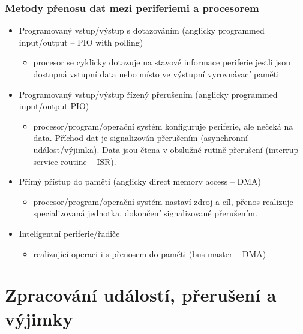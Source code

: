 \documentclass{beamer}
\begin{document}
\begin{frame}
\frametitle{Metody přenosu dat mezi periferiemi a procesorem}

\begin{itemize}
 \item Programovaný vstup/výstup s dotazováním (anglicky programmed input/output -- PIO with polling)
 \begin{itemize}
  \item procesor se cyklicky dotazuje na stavové informace periferie
        jestli jsou dostupná vstupní data nebo místo ve výstupní vyrovnávací paměti
 \end{itemize}
\end{itemize}
\begin{itemize}
 \item Programovaný vstup/výstup řízený přerušením (anglicky programmed input/output PIO)
 \begin{itemize}
  \item procesor/program/operační systém konfiguruje periferie, ale nečeká
        na data. Příchod dat je signalizován přerušením (asynchronní
        událost/výjimka). Data jsou čtena v obslužné rutině přerušení (interrup service routine -- ISR).
 \end{itemize}
\end{itemize}
\begin{itemize}
 \item Přímý přístup do paměti (anglicky direct memory access -- DMA)
 \begin{itemize}
  \item procesor/program/operační systém nastaví zdroj a cíl, přenos realizuje
        specializovaná jednotka, dokončení signalizované přerušením.
 \end{itemize}
\end{itemize}
\begin{itemize}
 \item Inteligentní periferie/řadiče 
 \begin{itemize}
  \item realizující operaci i s přenosem do paměti (bus master -- DMA)
 \end{itemize}
\end{itemize}
\end{frame}

\section{Zpracování událostí, přerušení a výjimky}
\end{document}
